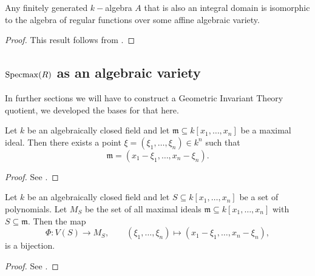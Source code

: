 \begin{proposition}\label{prop:kalgebras-affinevar}
	Any finitely generated $k-$algebra $A$ that is also an integral domain is isomorphic to the algebra of regular functions over some affine algebraic variety.
\end{proposition}

\begin{proof}
	This result follows from \cite[Ch.~15, Cor.~5]{dummitAbstractAlgebra2004}.
\end{proof}


\subsection{$\operatorname{Specmax}(R)$ as an algebraic variety} \label{subsec:Specmax}

In further sections we will have to construct a Geometric Invariant Theory quotient, we developed the bases for that here.

\begin{proposition}
	
\end{proposition}



\begin{proposition}
    Let $k$ be an algebraically closed field and let $\mathfrak{m} \subseteq k[x_1, \dots, x_n]$ be a maximal ideal. Then there exists a point $\xi = (\xi_1, \dots, \xi_n) \in k^n$ such that
    \[
        \mathfrak{m} = (x_1 - \xi_1, \dots, x_n - \xi_n).
    \]
\end{proposition}
 
\begin{proof}
    See \cite[Prop.~1.5]{kemperCourseCommutativeAlgebra2011}.
\end{proof}


\begin{theorem}\label{thm:points-maximal-ideals}
    Let $k$ be an algebraically closed field and let $S \subseteq k[x_1, \dots, x_n]$ be a set of polynomials. Let $M_S$ be the set of all maximal ideals $\mathfrak{m} \subseteq k[x_1, \dots, x_n]$ with $S \subseteq \mathfrak{m}$. Then the map
    \[
        \Phi : V(S) \to M_S, \qquad (\xi_1, \dots, \xi_n) \mapsto (x_1 - \xi_1, \dots, x_n - \xi_n),
    \]
    is a bijection.
\end{theorem}
 
\begin{proof}
    See \cite[Thm.~1.7]{kemperCourseCommutativeAlgebra2011}.
\end{proof}


